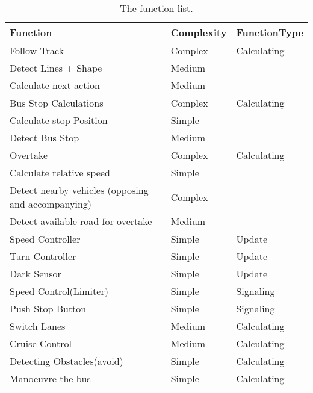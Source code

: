 \begin{table}[H]
\centering
\begin{tabular}{|l|l|l|}
\hline
\rowcolor[HTML]{FFFFFF} 
Function                                           & Complexity & FunctionType \\ \hline
\rowcolor[HTML]{9B9B9B} 
Follow Track                                       & Complex    & Calculating  \\ \hline
\rowcolor[HTML]{C0C0C0} 
Detect Lines + Shape                               & Medium     &              \\ \hline
\rowcolor[HTML]{C0C0C0} 
Calculate next action                              & Medium     &              \\ \hline
\rowcolor[HTML]{9B9B9B} 
Bus Stop Calculations                              & Complex    & Calculating  \\ \hline
\rowcolor[HTML]{C0C0C0} 
Calculate stop Position                            & Simple     &              \\ \hline
\rowcolor[HTML]{C0C0C0} 
Detect Bus Stop                                    & Medium     &              \\ \hline
\rowcolor[HTML]{9B9B9B} 
Overtake                                           & Complex    & Calculating  \\ \hline
\rowcolor[HTML]{C0C0C0} 
Calculate relative speed                           & Simple     &              \\ \hline
\rowcolor[HTML]{C0C0C0} 
Detect nearby vehicles (opposing and accompanying) & Complex    &              \\ \hline
\rowcolor[HTML]{C0C0C0} 
Detect available road for overtake                 & Medium     &              \\ \hline
Speed Controller                                   & Simple     & Update       \\ \hline
Turn Controller                                    & Simple     & Update       \\ \hline
Dark Sensor                                        & Simple     & Update       \\ \hline
Speed Control(Limiter)                             & Simple     & Signaling    \\ \hline
Push Stop Button                                   & Simple     & Signaling    \\ \hline
Switch Lanes                                       & Medium     & Calculating  \\ \hline
Cruise Control                                     & Medium     & Calculating  \\ \hline
Detecting Obstacles(avoid)                         & Simple     & Calculating    \\ \hline
Manoeuvre the bus                         & Simple     & Calculating    \\ \hline
\end{tabular}
\caption{The function list.}
\label{functionlist}
\end{table}






